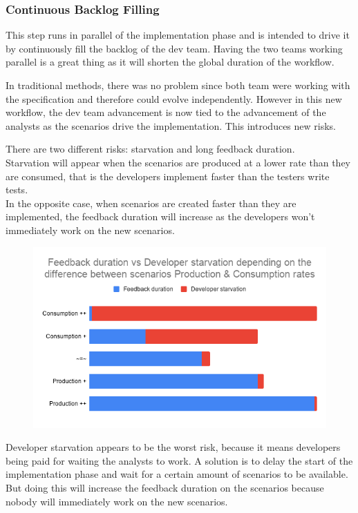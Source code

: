 \subsubsection{Continuous Backlog Filling}
This step runs in parallel of the implementation phase and is intended to
drive it by continuously fill the backlog of the dev team.
Having the two teams working parallel is a great thing as it will shorten the
global duration of the workflow.

In traditional methods, there was no problem since both team were working
with the specification and therefore could evolve independently.
However in this new workflow, the dev team advancement is now tied to the
advancement of the analysts as the scenarios drive the implementation.
This introduces new risks.

There are two different risks: starvation and long feedback duration. \\
Starvation will appear when the scenarios are produced at a lower rate than
they are consumed, that is the developers implement faster than the testers
write tests. \\
In the opposite case, when scenarios are created faster than they are
implemented, the feedback duration will increase as the developers won't
immediately work on the new scenarios.

\begin{figure}
    \includegraphics[width=\textwidth]{../../resources/images/solution/feedback_vs_starvation.png}
    \centering
\end{figure}

Developer starvation appears to be the worst risk, because it means
developers being paid for waiting the analysts to work.
A solution is to delay the start of the implementation phase and wait for a
certain amount of scenarios to be available.
But doing this will increase the feedback duration on the scenarios because
nobody will immediately work on the new scenarios.

